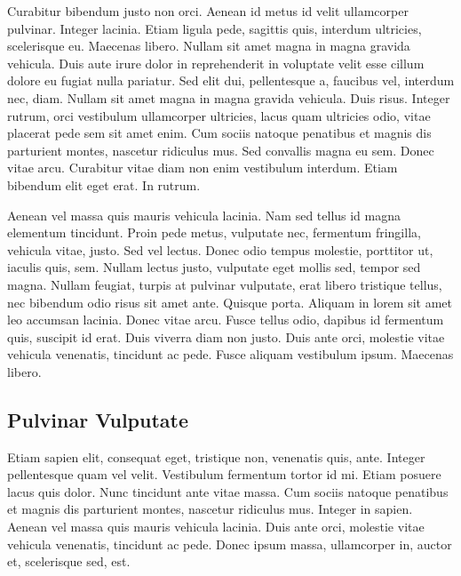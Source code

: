 Curabitur bibendum justo non orci. Aenean id metus id velit ullamcorper pulvinar. Integer lacinia. Etiam ligula pede, sagittis quis, interdum ultricies, scelerisque eu. Maecenas libero. Nullam sit amet magna in magna gravida vehicula. Duis aute irure dolor in reprehenderit in voluptate velit esse cillum dolore eu fugiat nulla pariatur. Sed elit dui, pellentesque a, faucibus vel, interdum nec, diam. Nullam sit amet magna in magna gravida vehicula. Duis risus. Integer rutrum, orci vestibulum ullamcorper ultricies, lacus quam ultricies odio, vitae placerat pede sem sit amet enim. Cum sociis natoque penatibus et magnis dis parturient montes, nascetur ridiculus mus. Sed convallis magna eu sem. Donec vitae arcu. Curabitur vitae diam non enim vestibulum interdum. Etiam bibendum elit eget erat. In rutrum.

Aenean vel massa quis mauris vehicula lacinia. Nam sed tellus id magna elementum tincidunt. Proin pede metus, vulputate nec, fermentum fringilla, vehicula vitae, justo. Sed vel lectus. Donec odio tempus molestie, porttitor ut, iaculis quis, sem. Nullam lectus justo, vulputate eget mollis sed, tempor sed magna. Nullam feugiat, turpis at pulvinar vulputate, erat libero tristique tellus, nec bibendum odio risus sit amet ante. Quisque porta. Aliquam in lorem sit amet leo accumsan lacinia. Donec vitae arcu. Fusce tellus odio, dapibus id fermentum quis, suscipit id erat. Duis viverra diam non justo. Duis ante orci, molestie vitae vehicula venenatis, tincidunt ac pede. Fusce aliquam vestibulum ipsum. Maecenas libero.

\subsection{Pulvinar Vulputate}
Etiam sapien elit, consequat eget, tristique non, venenatis quis, ante. Integer pellentesque quam vel velit. Vestibulum fermentum tortor id mi. Etiam posuere lacus quis dolor. Nunc tincidunt ante vitae massa. Cum sociis natoque penatibus et magnis dis parturient montes, nascetur ridiculus mus. Integer in sapien. Aenean vel massa quis mauris vehicula lacinia. Duis ante orci, molestie vitae vehicula venenatis, tincidunt ac pede. Donec ipsum massa, ullamcorper in, auctor et, scelerisque sed, est.

